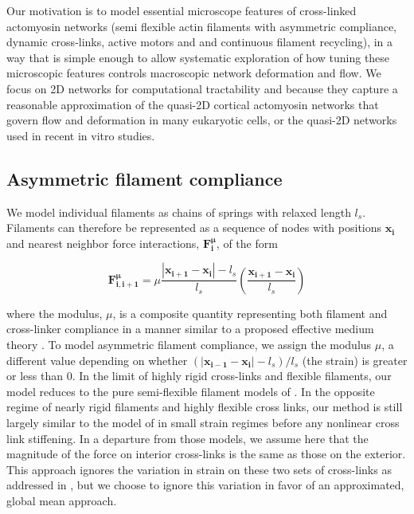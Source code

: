 \documentclass[10pt,letterpaper]{article}
\begin{document}
Our motivation is to model essential microscope features of cross-linked actomyosin networks (semi flexible actin filaments with asymmetric compliance, dynamic cross-links, active motors and and continuous filament recycling), in a way that is simple enough to allow systematic exploration of how tuning these microscopic features controls macroscopic network deformation and flow. We focus on 2D networks for computational tractability and because they capture a reasonable approximation of the quasi-2D cortical actomyosin networks that govern flow and deformation in many eukaryotic cells\cite{cellmech_flows, salbreuxbphs}, or the quasi-2D networks used in recent in vitro studies\cite{rheo_2D1,rheo_2D2}.


\subsection*{Asymmetric filament compliance}
We model individual filaments as chains of springs with relaxed length $l_s$.  Filaments can therefore be represented as a sequence of nodes with positions $\mathbf{x_i}$ and nearest neighbor force interactions, $\mathbf{F^{\mu}_i}$, of the form

\begin{equation}
\label{eqn:spring}
\mathbf{F^{\mu}_{i,i+1}} = \mu\frac{|\mathbf{x_{i+1}}-\mathbf{x_i}|-l_s}{l_s}\left ( \frac{\mathbf{x_{i+1}}-\mathbf{x_i}}{l_s}\right )
\end{equation}


where the modulus, $\mu$, is a composite quantity representing both filament and cross-linker compliance in a manner similar to a proposed effective medium theory \cite{theo_crosslinknonlinear}.   To model asymmetric filament compliance, we assign the modulus $\mu$, a different value depending on whether $(|\mathbf{x_{i-1}}-\mathbf{x_i}|-l_s)/l_s$ (the strain) is greater or less than 0. In the limit of highly rigid cross-links and flexible filaments, our model reduces to the pure semi-flexible filament models of \cite{theo_hlm,theo_hlm2}.  In the opposite regime of nearly rigid filaments and highly flexible cross links, our method is still largely similar to the model of \cite{theo_crosslinknonlinear} in small strain regimes before any nonlinear cross link stiffening.  In a departure from those models, we assume here that the magnitude of the force on interior cross-links is the same as those on the exterior.  This approach ignores the variation in strain on these two sets of cross-links as addressed in \cite{theo_crosslinknonlinear}, but we choose to ignore this variation in favor of an approximated, global mean approach.  
\end{document}
